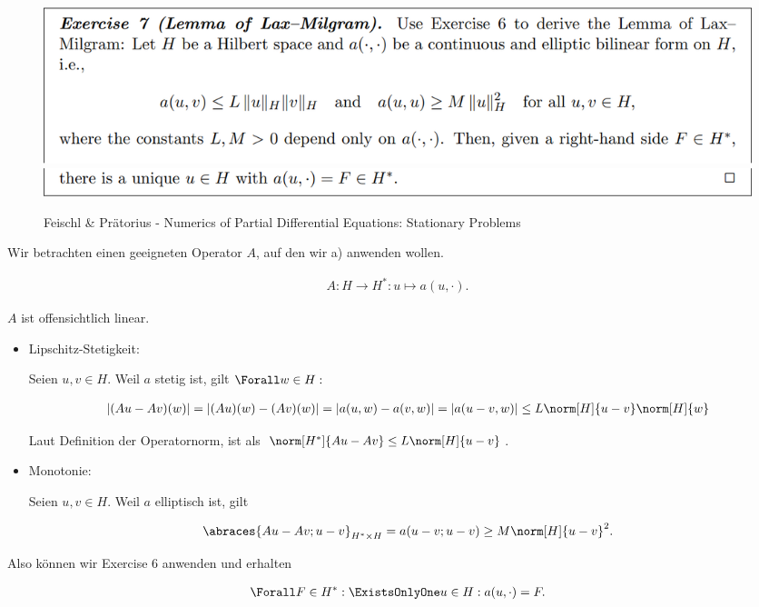 \begin{solution}
\begin{enumerate}[label = \textbf{\alph*)}]
  \begin{figure}[h!]
    \centering
    \includegraphics[width = 0.9 \textwidth]{../../../Fundament-LaTeX/images/NumPDEs/NumPDEs - Exercise 7.1 (Lemma of Lax-Milgram).png}
    \includegraphics[width = 0.9 \textwidth]{../../../Fundament-LaTeX/images/NumPDEs/NumPDEs - Exercise 7.2 (Lemma of Lax-Milgram).png}
    \caption{Feischl \& Prätorius - Numerics of Partial Differential Equations: Stationary Problems}
  \end{figure}

  Wir betrachten einen geeigneten Operator $A$, auf den wir a) anwenden wollen.

  \begin{align*}
    A:
    H \to H^\ast:
    u \mapsto a(u, \cdot).
  \end{align*}

  $A$ ist offensichtlich linear.

  \begin{itemize}

    \item Lipschitz-Stetigkeit:

    Seien $u, v \in H$.
    Weil $a$ stetig ist, gilt $\Forall w \in H:$

    \begin{align*}
      |(Au - Av)(w)|
      =
      |(Au)(w) - (Av)(w)|
      =
      |a(u, w) - a(v, w)|
      =
      |a(u - v, w)|
      \leq
      L \norm[H]{u - v} \norm[H]{w}
    \end{align*}

    Laut Definition der Operatornorm, ist als $\norm[H^\ast]{Au - Av} \leq L \norm[H]{u - v}$.

    \item Monotonie:

    Seien $u, v \in H$.
    Weil $a$ elliptisch ist, gilt

    \begin{align*}
      \abraces{Au - Av; u - v}_{H^\ast \times H}
      =
      a(u - v; u - v)
      \geq
      M \norm[H]{u - v}^2.
    \end{align*}

  \end{itemize}

  Also können wir Exercise 6 anwenden und erhalten

  \begin{align*}
    \Forall F \in H^\ast:
    \ExistsOnlyOne u \in H:
    a(u, \cdot) = F.
  \end{align*}

\end{enumerate}

\end{solution}

